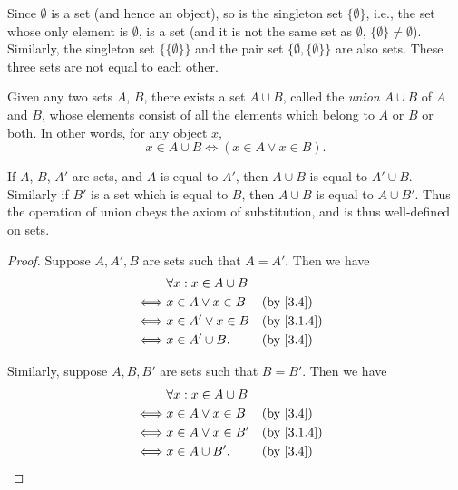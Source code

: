 \begin{eg}\label{3.1.10}
  Since \(\emptyset\) is a set (and hence an object), so is the singleton set \(\{\emptyset\}\), i.e., the set whose only element is \(\emptyset\), is a set (and it is not the same set as \(\emptyset\), \(\{\emptyset\} \neq \emptyset\)).
  Similarly, the singleton set \(\{\{\emptyset\}\}\) and the pair set \(\{\emptyset, \{\emptyset\}\}\) are also sets.
  These three sets are not equal to each other.
\end{eg}

\begin{ax}\label{3.4}
  Given any two sets \(A\), \(B\), there exists a set \(A \cup B\), called the \emph{union} \(A \cup B\) of \(A\) and \(B\), whose elements consist of all the elements which belong to \(A\) or \(B\) or both.
  In other words, for any object \(x\),
  \[
    x \in A \cup B \iff (x \in A \lor x \in B).
  \]
\end{ax}

\setcounter{thm}{11}
\begin{rmk}\label{3.1.12}
  If \(A\), \(B\), \(A'\) are sets, and \(A\) is equal to \(A'\), then \(A \cup B\) is equal to \(A' \cup B\).
  Similarly if \(B'\) is a set which is equal to \(B\), then \(A \cup B\) is equal to \(A \cup B'\).
  Thus the operation of union obeys the axiom of substitution, and is thus well-defined on sets.
\end{rmk}

\begin{proof}
  Suppose \(A, A', B\) are sets such that \(A = A'\).
  Then we have
  \begin{align*}
         & \forall x : x \in A \cup B                             \\
    \iff & x \in A \lor x \in B       &  & \text{(by \cref{3.4})} \\
    \iff & x \in A' \lor x \in B      &  & \by{3.1.4}             \\
    \iff & x \in A' \cup B.           &  & \text{(by \cref{3.4})}
  \end{align*}

  Similarly, suppose \(A, B, B'\) are sets such that \(B = B'\).
  Then we have
  \begin{align*}
         & \forall x : x \in A \cup B                             \\
    \iff & x \in A \lor x \in B       &  & \text{(by \cref{3.4})} \\
    \iff & x \in A \lor x \in B'      &  & \by{3.1.4}             \\
    \iff & x \in A \cup B'.           &  & \text{(by \cref{3.4})}
  \end{align*}
\end{proof}

